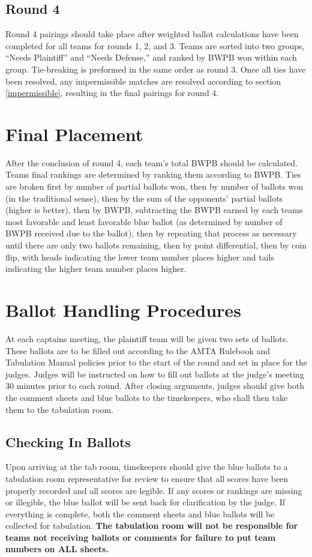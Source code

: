 \documentclass{article}
\begin{document}
\subsection{Round 4}
Round 4 pairings should take place after weighted ballot calculations have been completed for all teams for rounds 1, 2, and 3.  Teams are sorted into two groups, ``Needs Plaintiff'' and ``Needs Defense,'' and ranked by BWPB won within each group.  Tie-breaking is preformed in the same order as round 3.  Once all ties have been resolved, any impermissible matches are resolved according to section \ref{impermissible}, resulting in the final pairings for round 4.
\section{Final Placement}
After the conclusion of round 4, each team's total BWPB should be calculated.  Teams final rankings are determined by ranking them according to BWPB.  Ties are broken first by number of partial ballots won, then by number of ballots won (in the traditional sense), then by the sum of the opponents' partial ballots (higher is better), then by BWPB, subtracting the BWPB earned by each teams most favorable and least favorable blue ballot (as determined by number of BWPB received due to the ballot), then by repeating that process as necessary until there are only two ballots remaining, then by point differential, then by coin flip, with heads indicating the lower team number places higher and tails indicating the higher team number places higher.
\section{Ballot Handling Procedures}
At each captains meeting, the plaintiff team will be given two sets of ballots.  These ballots are to be filled out according to the AMTA Rulebook and Tabulation Manual policies prior to the start of the round and set in place for the judges.  Judges will be instructed on how to fill out ballots at the judge's meeting 30 minutes prior to each round.  After closing arguments, judges should give both the comment sheets and blue ballots to the timekeepers, who shall then take them to the tabulation room.
\subsection{Checking In Ballots}
Upon arriving at the tab room, timekeepers should give the blue ballots to a tabulation room representative for review to ensure that all scores have been properly recorded and all scores are legible.  If any scores or rankings are missing or illegible, the blue ballot will be sent back for clarification by the judge.  If everything is complete, both the comment sheets and blue ballots will be collected for tabulation.  \textbf{The tabulation room will not be responsible for teams not receiving ballots or comments for failure to put team numbers on ALL sheets.}
\end{document}
